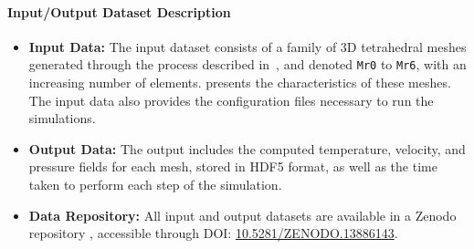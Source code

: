 \paragraph{Input/Output Dataset Description}

\begin{itemize}
    \item \textbf{Input Data:} The input dataset consists of a family of 3D tetrahedral meshes generated through the process described in~\cite{chabannes_3d_2024}, and denoted \texttt{Mr0} to \texttt{Mr6}, with an increasing number of elements.
     presents the characteristics of these meshes.
    The input data also provides the configuration files necessary to run the simulations.
    \item \textbf{Output Data:} The output includes the computed temperature, velocity, and pressure fields for each mesh, stored in HDF5 format, as well as the time taken to perform each step of the simulation.
    \item \textbf{Data Repository:} All input and output datasets are available in a Zenodo repository \cite{saigre_mesh_2024}, accessible through DOI: \href{https://doi.org/10.5281/ZENODO.13886143}{10.5281/ZENODO.13886143}.
\end{itemize}


